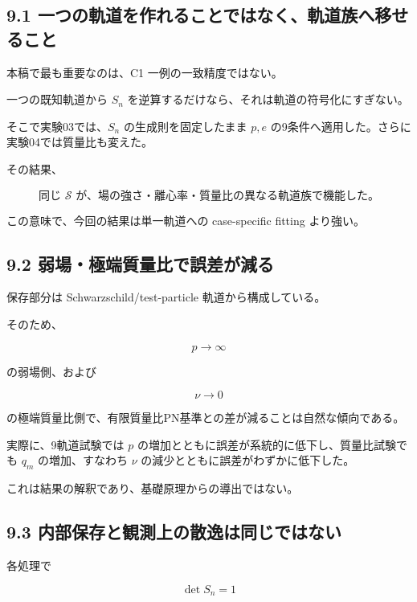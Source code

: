 \documentclass[
  a4paper,
]{ltjsarticle}
\begin{document}
\subsection{9.1
一つの軌道を作れることではなく、軌道族へ移せること}\label{ux4e00ux3064ux306eux8eccux9053ux3092ux4f5cux308cux308bux3053ux3068ux3067ux306fux306aux304fux8eccux9053ux65cfux3078ux79fbux305bux308bux3053ux3068}

本稿で最も重要なのは、C1 一例の一致精度ではない。

一つの既知軌道から \(S_n\)
を逆算するだけなら、それは軌道の符号化にすぎない。

そこで実験03では、\(S_n\) の生成則を固定したまま \(p,e\)
の9条件へ適用した。さらに実験04では質量比も変えた。

その結果、

\[
\boxed{
\text{同じ }\mathcal S\text{ が、場の強さ・離心率・質量比の異なる軌道族で機能した。}
}
\]

この意味で、今回の結果は単一軌道への case-specific fitting より強い。

\subsection{9.2
弱場・極端質量比で誤差が減る}\label{ux5f31ux5834ux6975ux7aefux8ceaux91cfux6bd4ux3067ux8aa4ux5deeux304cux6e1bux308b}

保存部分は Schwarzschild/test-particle 軌道から構成している。

そのため、

\[
p\rightarrow\infty
\]

の弱場側、および

\[
\nu\rightarrow0
\]

の極端質量比側で、有限質量比PN基準との差が減ることは自然な傾向である。

実際に、9軌道試験では \(p\)
の増加とともに誤差が系統的に低下し、質量比試験でも \(q_m\)
の増加、すなわち \(\nu\) の減少とともに誤差がわずかに低下した。

これは結果の解釈であり、基礎原理からの導出ではない。

\subsection{9.3
内部保存と観測上の散逸は同じではない}\label{ux5185ux90e8ux4fddux5b58ux3068ux89b3ux6e2cux4e0aux306eux6563ux9038ux306fux540cux3058ux3067ux306fux306aux3044}

各処理で

\[
\det S_n=1
\]
\end{document}

